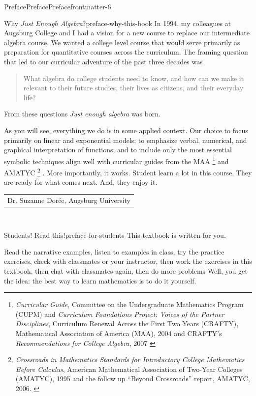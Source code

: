 \documentclass[twoside,11pt,]{book}
\numberwithin{equation}{section}
\begin{document}
\begin{preface}{Preface}{Preface}{}{Preface}{}{}{frontmatter-6}
\begin{paragraphs}{Why \emph{Just Enough Algebra}?}{preface-why-this-book}%
In 1994, my colleagues at Augsburg College and I had a vision for a new course to replace our intermediate algebra course. We wanted a college level course that would serve primarily as preparation for quantitative courses across the curriculum. The framing question that led to our curricular adventure of the past three decades was%
\begin{quote}%
What algebra do college students need to know, and how can we make it relevant to their future studies, their lives as citizens, and their everyday life?%
\end{quote}
From these questions \emph{Just enough algebra} was born.%
\par
As you will see, everything we do is in some applied context. Our choice to focus primarily on linear and exponential models; to emphasize verbal, numerical, and graphical interpretation of functions; and to include only the most essential symbolic techniques align well with curricular guides from the MAA \footnote{\emph{Curricular Guide}, Committee on the Undergraduate Mathematics Program (CUPM) and \emph{Curriculum Foundations Project: Voices of the Partner Disciplines}, Curriculum Renewal Across the First Two Years (CRAFTY), Mathematical Association of America (MAA), 2004 and CRAFTY's \emph{Recommendations for College Algebra}, 2007%
\label{preface-why-this-book-5-1}} and AMATYC \footnote{\emph{Crossroads in Mathematics Standards for Introductory College Mathematics Before Calculus}, American Mathematical Association of Two-Year Colleges (AMATYC), 1995 and the follow up ``Beyond Crossroads'' report, AMATYC, 2006.%
\label{preface-why-this-book-5-2}} . More importantly, it works. Student learn a lot in this course. They are ready for what comes next. And, they enjoy it.%
\nopagebreak\par%
\hfill\begin{tabular}[t]{l@{}}
Dr. Suzanne Dorée, Augsburg University
\end{tabular}\\\par
\end{paragraphs}%
\begin{paragraphs}{Students! Read this!}{preface-for-students}%
This textbook is written for you.%
\par
Read the narrative examples, listen to examples in class, try the practice exercises, check with classmates or your instructor, then work the exercises in this textbook, then chat with classmates again, then do more problems \textellipsis{} Well, you get the idea: the best way to learn mathematics is to do it yourself.%

\end{paragraphs}
\end{preface}
\end{document}
